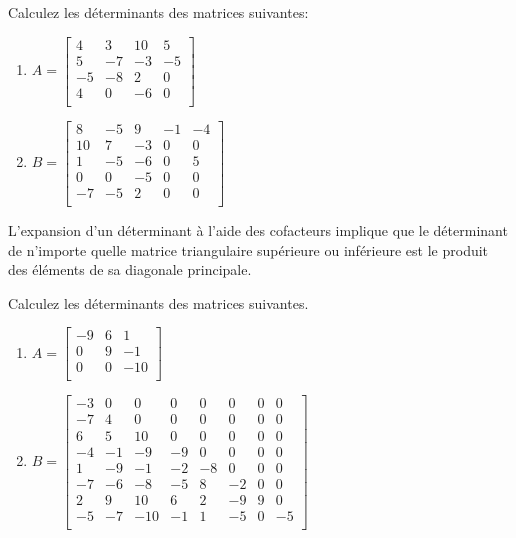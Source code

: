 \documentclass[]{book}
\providecommand{\tightlist}{%
  \setlength{\itemsep}{0pt}\setlength{\parskip}{0pt}}
\theoremstyle{definition}
\theoremstyle{definition}
\theoremstyle{definition}
\theoremstyle{remark}
\let\BeginKnitrBlock\begin \let\EndKnitrBlock\end
\begin{document}
\BeginKnitrBlock{example}
\protect\hypertarget{exm:unnamed-chunk-100}{}{\label{exm:unnamed-chunk-100} }Calculez les déterminants des matrices suivantes:

\begin{enumerate}
\def\labelenumi{\alph{enumi}.}
\tightlist
\item
  \(A=\begin{bmatrix} 4&3&10&5\\ 5&-7&-3&-5\\ -5&-8&2&0\\ 4&0&-6&0\\ \end{bmatrix}\)
\item
  \(B=\begin{bmatrix} 8&-5&9&-1&-4\\ 10&7&-3&0&0\\ 1&-5&-6&0&5\\ 0&0&-5&0&0\\ -7&-5&2&0&0\\ \end{bmatrix}\)
\end{enumerate}
\EndKnitrBlock{example}

\BeginKnitrBlock{remark}
{}L'expansion d'un déterminant à l'aide des cofacteurs implique que le déterminant de n'importe quelle matrice triangulaire supérieure ou inférieure est le produit des éléments de sa diagonale principale.
\EndKnitrBlock{remark}

\BeginKnitrBlock{example}
\protect\hypertarget{exm:unnamed-chunk-102}{}{\label{exm:unnamed-chunk-102} }Calculez les déterminants des matrices suivantes.

\begin{enumerate}
\def\labelenumi{\alph{enumi}.}
\tightlist
\item
  \(A=\begin{bmatrix} -9&6&1\\ 0&9&-1\\ 0&0&-10\\ \end{bmatrix}\)
\item
  \(B=\begin{bmatrix} -3&0&0&0&0&0&0&0\\ -7&4&0&0&0&0&0&0\\ 6&5&10&0&0&0&0&0\\ -4&-1&-9&-9&0&0&0&0\\ 1&-9&-1&-2&-8&0&0&0\\ -7&-6&-8&-5&8&-2&0&0\\ 2&9&10&6&2&-9&9&0\\ -5&-7&-10&-1&1&-5&0&-5\\ \end{bmatrix}\)
\end{enumerate}
\EndKnitrBlock{example}
\end{document}
